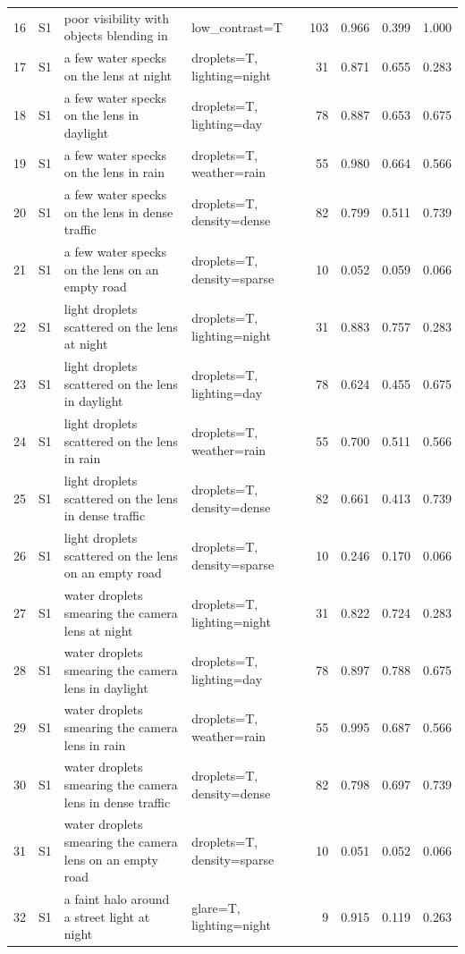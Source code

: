 \begin{longtable}{r l p{5.0cm} p{3.4cm} r r r r}
16 & S1 & poor visibility with objects blending in & low\_contrast=T & 103 & 0.966 & 0.399 & 1.000\\
17 & S1 & a few water specks on the lens at night & droplets=T, lighting=night & 31 & 0.871 & 0.655 & 0.283\\
18 & S1 & a few water specks on the lens in daylight & droplets=T, lighting=day & 78 & 0.887 & 0.653 & 0.675\\
19 & S1 & a few water specks on the lens in rain & droplets=T, weather=rain & 55 & 0.980 & 0.664 & 0.566\\
20 & S1 & a few water specks on the lens in dense traffic & droplets=T, density=dense & 82 & 0.799 & 0.511 & 0.739\\
21 & S1 & a few water specks on the lens on an empty road & droplets=T, density=sparse & 10 & 0.052 & 0.059 & 0.066\\
22 & S1 & light droplets scattered on the lens at night & droplets=T, lighting=night & 31 & 0.883 & 0.757 & 0.283\\
23 & S1 & light droplets scattered on the lens in daylight & droplets=T, lighting=day & 78 & 0.624 & 0.455 & 0.675\\
24 & S1 & light droplets scattered on the lens in rain & droplets=T, weather=rain & 55 & 0.700 & 0.511 & 0.566\\
25 & S1 & light droplets scattered on the lens in dense traffic & droplets=T, density=dense & 82 & 0.661 & 0.413 & 0.739\\
26 & S1 & light droplets scattered on the lens on an empty road & droplets=T, density=sparse & 10 & 0.246 & 0.170 & 0.066\\
27 & S1 & water droplets smearing the camera lens at night & droplets=T, lighting=night & 31 & 0.822 & 0.724 & 0.283\\
28 & S1 & water droplets smearing the camera lens in daylight & droplets=T, lighting=day & 78 & 0.897 & 0.788 & 0.675\\
29 & S1 & water droplets smearing the camera lens in rain & droplets=T, weather=rain & 55 & 0.995 & 0.687 & 0.566\\
30 & S1 & water droplets smearing the camera lens in dense traffic & droplets=T, density=dense & 82 & 0.798 & 0.697 & 0.739\\
31 & S1 & water droplets smearing the camera lens on an empty road & droplets=T, density=sparse & 10 & 0.051 & 0.052 & 0.066\\
32 & S1 & a faint halo around a street light at night & glare=T, lighting=night & 9 & 0.915 & 0.119 & 0.263\\

\end{longtable}
